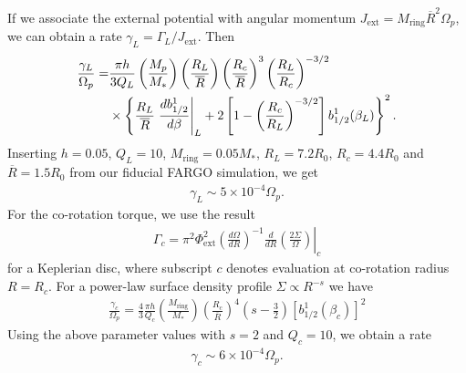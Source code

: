 If we associate the external potential with angular momentum 
$J_\mathrm{ext}  = M_\mathrm{ring}\overline{R}^2\Omega_p$, we can obtain a
rate $\gamma_L=\Gamma_L/J_\mathrm{ext}$. Then 
\begin{align}
  \frac{\gamma_L}{\Omega_p} = &\frac{\pi
    h}{3Q_L}\left(\frac{M_p}{M_*}\right)\left(\frac{R_L}{\overline{R}}\right)\left(\frac{R_c}{\overline{R}}\right) 
  ^3\left(\frac{R_L}{R_c}\right)^{-3/2}\notag\\ 
  &\times
  \left\{\frac{R_L}{\overline{R}}\left.\frac{db_{1/2}^1}{d\beta}\right|_L
    + 2\left[1 - 
      \left(\frac{R_c}{R_L}\right)^{-3/2}\right]b_{1/2}^1(\beta_L)\right\}^2. 
\end{align}
Inserting $h=0.05$, $Q_L=10$, $M_\mathrm{ring} = 0.05M_*$,
$R_L=7.2R_0$, $R_c=4.4R_0$ and $\overline{R}=1.5R_0$ from our fiducial
FARGO simulation, we get
\begin{align}
  \gamma_L \sim 5\times10^{-4}\Omega_p. 
\end{align}
For the co-rotation torque, we use the result
\begin{align}
  \Gamma_c = \left.
    \pi^2\Phi_\mathrm{ext}^2\left(\frac{d\Omega}{dR}\right)^{-1}\frac{d}{dR}\left(\frac{2\Sigma}{\Omega}\right)\right|_{c}     
\end{align}
for a Keplerian disc, where subscript $c$ denotes evaluation at
co-rotation radius $R=R_c$. For a power-law surface density profile
$\Sigma\propto R^{-s}$ we have
\begin{align}
\frac{\gamma_c}{\Omega_p} = \frac{4}{3}\frac{\pi h}{Q_c}
\left(\frac{M_\mathrm{ring}}{M_*}\right)\left(\frac{R_c}{\overline{R}}\right)^4\left(s-\frac{3}{2}\right) 
\left[b_{1/2}^1(\beta_c)\right]^2    
\end{align}
Using the above parameter values with $s=2$ and $Q_c=10$, we obtain a
rate
\begin{align}
  \gamma_c\sim 6\times 10^{-4}\Omega_p. 
\end{align}

